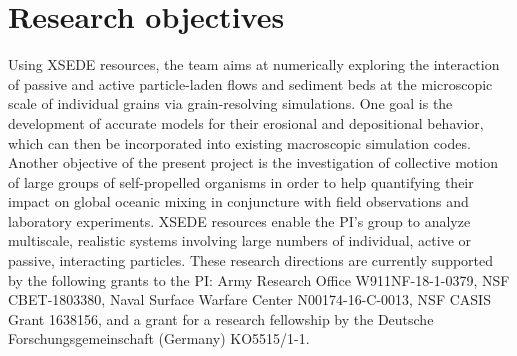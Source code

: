 \documentclass[10pt]{article}
\begin{document}

\section{Research objectives}

Using XSEDE resources, the team aims at numerically exploring the interaction of passive and active particle-laden flows and sediment beds at the microscopic scale of individual grains via grain-resolving simulations. One goal is the development of accurate models for their erosional and depositional behavior, which can then be incorporated into existing macroscopic simulation codes. Another objective of the present project is the investigation of collective motion of large groups of self-propelled organisms in order to help quantifying their impact on global oceanic mixing in conjuncture with field observations and laboratory experiments. XSEDE resources enable the PI's group to analyze multiscale, realistic systems involving large numbers of individual, active or passive, interacting particles. These research directions are currently supported by the following grants to the PI: Army Research Office W911NF-18-1-0379, NSF CBET-1803380, Naval Surface Warfare Center N00174-16-C-0013, NSF CASIS Grant 1638156, and a grant for a research fellowship
by the Deutsche Forschungsgemeinschaft (Germany) KO5515/1-1.
\end{document}
